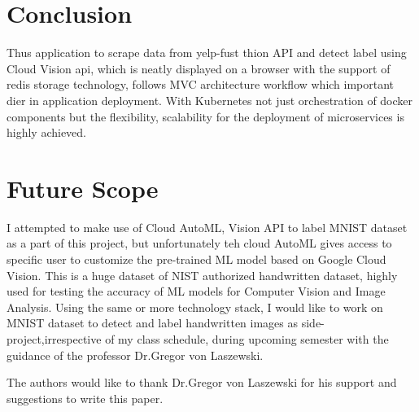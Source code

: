 \section{Conclusion}

Thus application to scrape data from yelp-fust thion API and detect label
using Cloud Vision api, which is neatly displayed on a browser with
the support of redis storage technology, follows MVC architecture
workflow which important dier in application deployment. With
Kubernetes not just orchestration of docker components but the
flexibility, scalability for the deployment of microservices is highly
achieved.
  
\section{Future Scope}

I attempted to make use of Cloud AutoML, Vision API to label MNIST
dataset as a part of this project, but unfortunately teh cloud AutoML
gives access to specific user to customize the pre-trained ML model
based on Google Cloud Vision. This is a huge dataset of NIST
authorized handwritten dataset, highly used for testing the accuracy
of ML models for Computer Vision and Image Analysis. Using the same or
more technology stack, I would like to work on MNIST dataset to detect
and label handwritten images as side-project,irrespective of my class
schedule, during upcoming semester with the guidance of the professor
Dr.Gregor von Laszewski.

\begin{acks}

  The authors would like to thank Dr.Gregor von Laszewski for his
  support and suggestions to write this paper.
  
\end{acks}




